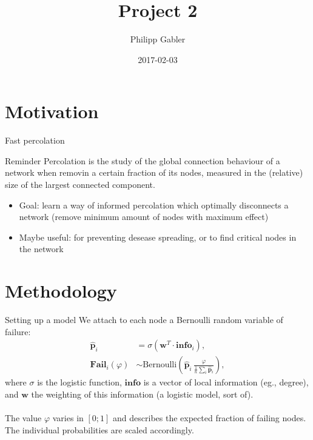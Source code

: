 \documentclass{beamer}
\author{Philipp Gabler}
\title{Project 2}
\date{2017-02-03}
\begin{document}
\beamertemplatenavigationsymbolsempty

\section{Motivation}
\begin{frame}{Fast percolation}
  \begin{block}{Reminder}
    Percolation is the study of the global connection behaviour of a network when removin a certain
    fraction of its nodes, measured in the (relative) size of the largest connected component.
  \end{block}
  
  \begin{itemize}
  \item Goal: learn a way of informed percolation which optimally disconnects a network (remove
    minimum amount of nodes with maximum effect)
  \item Maybe useful: for preventing desease spreading, or to find critical nodes in the network
  \end{itemize}
\end{frame}


\section{Methodology}
\begin{frame}{Setting up a model}
We attach to each node a Bernoulli random variable of failure:
\begin{align*}
  \hat{\mathbf{p}}_i &= \sigma(\mathbf{w}^T \cdot \mathbf{info}_i), \\
  \mathbf{Fail}_i(\varphi) &\sim \text{Bernoulli}\left(\hat{\mathbf{p}}_i\,
                      \frac{\varphi}{\frac{1}{n}\sum_i \hat{\mathbf{p}}_i}\right),
\end{align*}
where \(\sigma\) is the logistic function, \(\mathbf{info}\) is a vector of local information (eg.,
degree), and \(\mathbf{w}\) the weighting of this information (a logistic model, sort of).\\~\\

The value \(\varphi\) varies in \([0; 1]\) and describes the expected fraction of failing nodes.  The
individual probabilities are scaled accordingly.
\end{frame}
\end{document}
